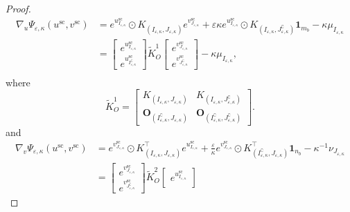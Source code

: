 \begin{proof}
\newpage
\begin{align*} 
\nabla_u \Psi_{\varepsilon, \kappa}(u^{\text{sc}},v^{\text{sc}}) &= e^{u^{\text{sc}}_{I_{\varepsilon,\kappa}}} \odot K_{(I_{\varepsilon,\kappa}, J_{\varepsilon,\kappa})} e^{v^{\text{sc}}_{J_{\varepsilon,\kappa}}} + \varepsilon\kappa e^{u^{\text{sc}}_{I_{\varepsilon,\kappa}}} \odot K_{(I_{\varepsilon,\kappa}, J^\complement_{\varepsilon,\kappa})} \mathbf 1_{m_b} - \kappa \mu_{I_{\varepsilon,\kappa}}\\
&= 
\begin{bmatrix}
e^{u^{\text{sc}}_{I_{\varepsilon,\kappa}}}\\
e^{u^{\text{sc}}_{I^\complement_{\varepsilon,\kappa}}}
\end{bmatrix}
\tilde{K}^1_O
\begin{bmatrix}
e^{v^{\text{sc}}_{J_{\varepsilon,\kappa}}}\\
e^{v^{\text{sc}}_{J^\complement_{\varepsilon,\kappa}}}
\end{bmatrix}
- \kappa \mu_{I_{\varepsilon,\kappa}},\\
\end{align*}
where 
\begin{equation*}
\tilde{K}^1_O = 
\begin{bmatrix}
K_{(I_{\varepsilon,\kappa}, J_{\varepsilon,\kappa})} & K_{(I_{\varepsilon,\kappa}, J^\complement_{\varepsilon,\kappa})}\\
\mathbf O_{(I^\complement_{\varepsilon,\kappa}, J_{\varepsilon,\kappa})} &\mathbf O_{(I^\complement_{\varepsilon,\kappa}, J^\complement_{\varepsilon,\kappa})}
\end{bmatrix}.
\end{equation*}
and 
\begin{align*} 
\nabla_v \Psi_{\varepsilon, \kappa}(u^{\text{sc}},v^{\text{sc}}) &= e^{v^{\text{sc}}_{J_{\varepsilon,\kappa}}} \odot K^\top_{(I_{\varepsilon,\kappa}, J_{\varepsilon,\kappa})} e^{u^{\text{sc}}_{I_{\varepsilon,\kappa}}} + \frac\varepsilon\kappa e^{v^{\text{sc}}_{J_{\varepsilon,\kappa}}} \odot K^\top_{(I^\complement_{\varepsilon,\kappa}, J_{\varepsilon,\kappa})} \mathbf 1_{n_b} - \kappa^{-1} \nu_{J_{\varepsilon,\kappa}}\\
&= 
\begin{bmatrix}
e^{v^{\text{sc}}_{J_{\varepsilon, \kappa}}}\\
e^{v^{\text{sc}}_{J^\complement_{\varepsilon, \kappa}}}
\end{bmatrix}
\tilde{K}^2_O
\begin{bmatrix}
e^{u^{\text{sc}}_{I_{\varepsilon,\kappa}}}\\

\end{bmatrix}
\end{align*}
\end{proof}
